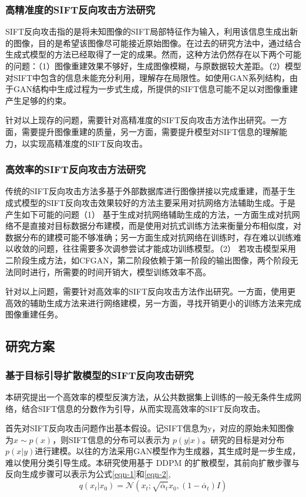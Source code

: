 \subsubsection{高精准度的SIFT反向攻击方法研究}
SIFT反向攻击指的是将未知图像的SIFT局部特征作为输入，利用该信息生成出新的图像，目的是希望该图像尽可能接近原始图像。在过去的研究方法中，通过结合生成式模型的方法已经取得了一定的成果。然而，这种方法仍然存在以下两个可能的问题：（1）图像重建效果不够好，生成图像模糊，与原数据较大差距。（2）模型对SIFT中包含的信息未能充分利用，理解存在局限性。如使用GAN系列结构，由于GAN结构中生成过程为一步式生成，所提供的SIFT信息可能不足以对图像重建产生足够的约束。
\par
针对以上现存的问题，需要针对高精准度的SIFT反向攻击方法作出研究。一方面，需要提升图像重建的质量，另一方面，需要提升模型对SIFT信息的理解能力，以实现高精准度的SIFT反向攻击。

\subsubsection{高效率的SIFT反向攻击方法研究}
传统的SIFT反向攻击方法多基于外部数据库进行图像拼接以完成重建，而基于生成式模型的SIFT反向攻击效果较好的方法主要采用对抗网络方法辅助生成。于是产生如下可能的问题（1） 基于生成对抗网络辅助生成的方法，一方面生成对抗网络不是直接对目标数据分布建模，而是使用对抗式训练方法来衡量分布相似度，对数据分布的建模可能不够准确；另一方面生成对抗网络在训练时，存在难以训练难以收敛的问题，往往需要多次调参尝试才能成功训练模型。（2） 若攻击模型采用二阶段生成方法，如CFGAN，第二阶段依赖于第一阶段的输出图像，两个阶段无法同时进行，所需要的时间开销大，模型训练效率不高。
\par
针对以上问题，需要针对高效率的SIFT反向攻击方法作出研究。一方面，使用更高效的辅助生成方法来进行网络建模，另一方面，寻找开销更小的训练方法来完成图像重建任务。

\subsection{研究方案}
\subsubsection{基于目标引导扩散模型的SIFT反向攻击研究}
本研究提出一个高效率的模型反演方法，从公共数据集上训练的一般无条件生成网络，结合SIFT信息的分数作为引导，从而实现高效率的SIFT反向攻击。
\par
首先对SIFT反向攻击问题作出基本假设。记SIFT信息为y，对应的原始未知图像为$x \sim p(x)$，则SIFT信息的分布可以表示为 $p(y|x)$。研究的目标是对分布$p(x|y)$进行建模。以往的方法采用GAN模型作为生成器，其生成时是一步生成，难以使用分类引导生成。本研究使用基于 DDPM 的扩散模型，其前向扩散步骤与反向生成步骤可以表示为公式\eqref{eqn-1}和\eqref{eqn-2},
\begin{equation}\label{eqn-1}
      q(x_t|x_{0})=\mathcal{N}(x_t;\sqrt{\overline{\alpha}_t}x_{0},(1-\overline{\alpha}_t)I)
\end{equation}

